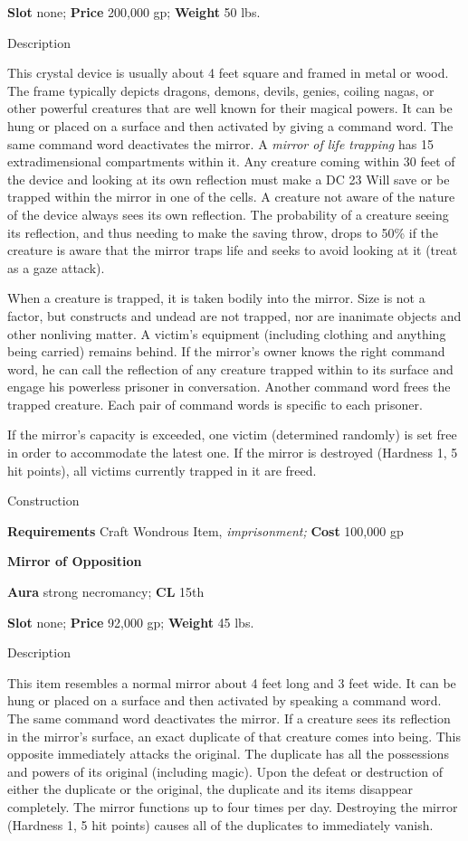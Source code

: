 \textbf{Slot} none; \textbf{Price} 200,000 gp; \textbf{Weight} 50 lbs.
				
Description
				
This crystal device is usually about 4 feet square and framed in metal or wood. The frame typically depicts dragons, demons, devils, genies, coiling nagas, or other powerful creatures that are well known for their magical powers. It can be hung or placed on a surface and then activated by giving a command word. The same command word deactivates the mirror. A \textit{mirror of life trapping} has 15 extradimensional compartments within it. Any creature coming within 30 feet of the device and looking at its own reflection must make a DC 23 Will save or be trapped within the mirror in one of the cells. A creature not aware of the nature of the device always sees its own reflection. The probability of a creature seeing its reflection, and thus needing to make the saving throw, drops to 50\% if the creature is aware that the mirror traps life and seeks to avoid looking at it (treat as a gaze attack).
				
When a creature is trapped, it is taken bodily into the mirror. Size is not a factor, but constructs and undead are not trapped, nor are inanimate objects and other nonliving matter. A victim's equipment (including clothing and anything being carried) remains behind. If the mirror's owner knows the right command word, he can call the reflection of any creature trapped within to its surface and engage his powerless prisoner in conversation. Another command word frees the trapped creature. Each pair of command words is specific to each prisoner.
				
If the mirror's capacity is exceeded, one victim (determined randomly) is set free in order to accommodate the latest one. If the mirror is destroyed (Hardness 1, 5 hit points), all victims currently trapped in it are freed. 
				
Construction
				
\textbf{Requirements} Craft Wondrous Item,\textit{ imprisonment;}\textbf{ Cost }100,000 gp
				
\textbf{Mirror of Opposition}
				
\textbf{Aura} strong necromancy;\textbf{ CL }15th
				
\textbf{Slot} none; \textbf{Price} 92,000 gp; \textbf{Weight} 45 lbs.
				
Description
				
This item resembles a normal mirror about 4 feet long and 3 feet wide. It can be hung or placed on a surface and then activated by speaking a command word. The same command word deactivates the mirror. If a creature sees its reflection in the mirror's surface, an exact duplicate of that creature comes into being. This opposite immediately attacks the original. The duplicate has all the possessions and powers of its original (including magic). Upon the defeat or destruction of either the duplicate or the original, the duplicate and its items disappear completely. The mirror functions up to four times per day. Destroying the mirror (Hardness 1, 5 hit points) causes all of the duplicates to immediately vanish.
				
